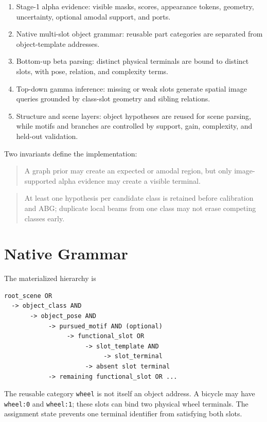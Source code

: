 \documentclass[11pt]{article}
\newcommand{\code}[1]{\texttt{#1}}
\begin{document}
\begin{enumerate}[leftmargin=*]
  \item Stage-1 alpha evidence: visible masks, scores, appearance tokens,
  geometry, uncertainty, optional amodal support, and ports.
  \item Native multi-slot object grammar: reusable part categories are separated
  from object-template addresses.
  \item Bottom-up beta parsing: distinct physical terminals are bound to distinct
  slots, with pose, relation, and complexity terms.
  \item Top-down gamma inference: missing or weak slots generate spatial image
  queries grounded by class-slot geometry and sibling relations.
  \item Structure and scene layers: object hypotheses are reused for scene
  parsing, while motifs and branches are controlled by support, gain, complexity,
  and held-out validation.
\end{enumerate}

Two invariants define the implementation:

\begin{quote}
A graph prior may create an expected or amodal region, but only image-supported
alpha evidence may create a visible terminal.
\end{quote}

\begin{quote}
At least one hypothesis per candidate class is retained before calibration and
ABG; duplicate local beams from one class may not erase competing classes early.
\end{quote}

\section{Native Grammar}

The materialized hierarchy is
\begin{lstlisting}
root_scene OR
  -> object_class AND
       -> object_pose AND
            -> pursued_motif AND (optional)
                 -> functional_slot OR
                      -> slot_template AND
                           -> slot_terminal
                      -> absent slot terminal
            -> remaining functional_slot OR ...
\end{lstlisting}

The reusable category \code{wheel} is not itself an object address. A bicycle may
have \code{wheel:0} and \code{wheel:1}; these slots can bind two physical wheel
terminals. The assignment state prevents one terminal identifier from satisfying
both slots.
\end{document}
